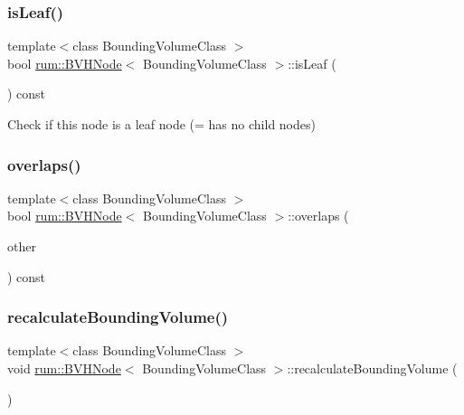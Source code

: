 \subsubsection{\texorpdfstring{is\+Leaf()}{isLeaf()}}
{\footnotesize\ttfamily template$<$class Bounding\+Volume\+Class $>$ \\
bool \mbox{\hyperlink{classrum_1_1_b_v_h_node}{rum\+::\+B\+V\+H\+Node}}$<$ Bounding\+Volume\+Class $>$\+::is\+Leaf (\begin{DoxyParamCaption}{ }\end{DoxyParamCaption}) const}

Check if this node is a leaf node (= has no child nodes) \mbox{\label{classrum_1_1_b_v_h_node_aa176d1fba23945d06408826696d71e96}} 
\subsubsection{\texorpdfstring{overlaps()}{overlaps()}}
{\footnotesize\ttfamily template$<$class Bounding\+Volume\+Class $>$ \\
bool \mbox{\hyperlink{classrum_1_1_b_v_h_node}{rum\+::\+B\+V\+H\+Node}}$<$ Bounding\+Volume\+Class $>$\+::overlaps (\begin{DoxyParamCaption}\item[{\mbox{\hyperlink{classrum_1_1_b_v_h_node}{B\+V\+H\+Node}}$<$ Bounding\+Volume\+Class $>$ $\ast$}]{other }\end{DoxyParamCaption}) const\hspace{0.3cm}{\ttfamily [protected]}}

\mbox{\label{classrum_1_1_b_v_h_node_a6f75cbc2e93e2f333c4506e5532e95c6}} 
\subsubsection{\texorpdfstring{recalculate\+Bounding\+Volume()}{recalculateBoundingVolume()}}
{\footnotesize\ttfamily template$<$class Bounding\+Volume\+Class $>$ \\
void \mbox{\hyperlink{classrum_1_1_b_v_h_node}{rum\+::\+B\+V\+H\+Node}}$<$ Bounding\+Volume\+Class $>$\+::recalculate\+Bounding\+Volume (\begin{DoxyParamCaption}{ }\end{DoxyParamCaption})\hspace{0.3cm}{\ttfamily [protected]}}



